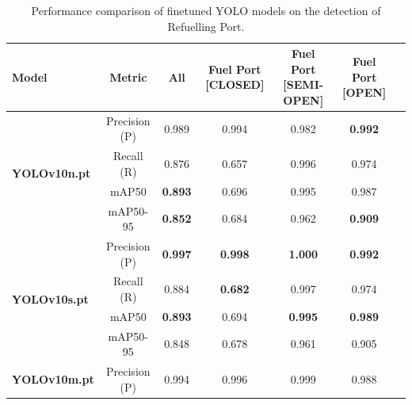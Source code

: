 \documentclass[12pt,oneside]{book} %
\begin{document}
\begin{table}[H]
    \centering
    \caption{Performance comparison of finetuned YOLO models on the detection of Refuelling Port.}
    \begin{adjustbox}{max width=\textwidth}
        \begin{tabular}{lcccccc}
            \toprule
            \textbf{Model}                        & \textbf{Metric} & \textbf{All}   & \textbf{Fuel Port [CLOSED]} & \textbf{Fuel Port [SEMI-OPEN]} & \textbf{Fuel Port [OPEN]} \\
            \midrule
            \multirow{4}{*}{\textbf{YOLOv10n.pt}} & Precision (P)   & 0.989          & 0.994                       & 0.982                          & \textbf{0.992}            \\
                                                  & Recall (R)      & 0.876          & 0.657                       & 0.996                          & 0.974                     \\
                                                  & mAP50           & \textbf{0.893} & 0.696                       & 0.995                          & 0.987                     \\
                                                  & mAP50-95        & \textbf{0.852} & 0.684                       & 0.962                          & \textbf{0.909}            \\
            \midrule
            \multirow{4}{*}{\textbf{YOLOv10s.pt}} & Precision (P)   & \textbf{0.997} & \textbf{0.998}              & \textbf{1.000}                 & \textbf{0.992}            \\
                                                  & Recall (R)      & 0.884          & \textbf{0.682}              & 0.997                          & 0.974                     \\
                                                  & mAP50           & \textbf{0.893} & 0.694                       & \textbf{0.995}                 & \textbf{0.989}            \\
                                                  & mAP50-95        & 0.848          & 0.678                       & 0.961                          & 0.905                     \\
            \midrule
            \multirow{4}{*}{\textbf{YOLOv10m.pt}} & Precision (P)   & 0.994          & 0.996                       & 0.999                          & 0.988                     \\

\end{tabular}
\end{adjustbox}
\end{table}
\end{document}
